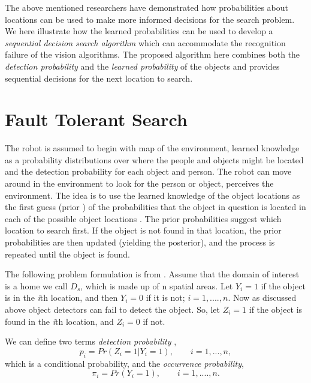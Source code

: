 The above mentioned researchers have demonstrated how probabilities about locations can be used to make more informed decisions for the search problem. We here illustrate how the learned probabilities can be used to develop a \emph{sequential decision search algorithm} which can accommodate the recognition failure of the vision algorithms. The proposed algorithm here combines both the \emph{detection probability} and the \emph{learned probability} of the objects and provides sequential decisions for the next location to search.

\section{Fault Tolerant Search}

The robot is assumed to begin with map of the environment, learned knowledge as a probability distributions over where the people and objects might be located and the detection probability for each object and person. The robot can move around in the environment to look for the person or object, perceives the environment. 
The idea is to use the learned knowledge of the object locations as the first guess (prior ) of the probabilities that the object in question is located in each of the possible object locations \cite{cressie2015statistics}. The prior probabilities suggest which location to search first. If the object is not found in that location, the prior probabilities are then updated (yielding the posterior), and the process is repeated until the object is found. 

The following problem formulation is from \cite[p. 25]{cressie2015statistics}.
Assume that the domain of interest is a home we call $D_s$, which is made up of n spatial areas. Let $Y_i = 1$ if the object is in the \emph{i}th location, and then $Y_i = 0$ if it is not; $ i = 1, .... , n$. Now as discussed above object detectors can fail to detect the object. So, let $Z_i = 1$ if the object is found in the \emph{i}th location, and $Z_i = 0$ if not.

We can define two terms \emph{detection probability} ,
\begin{equation}
	p_i = Pr(Z_i = 1| Y_i =1), \qquad  i = 1,...,n,
\end{equation}
which is a conditional probability, and the \emph{occurrence probability},
\begin{equation}
	\pi_i = Pr(Y_i = 1),\qquad  i = 1, .... , n.
\end{equation}


